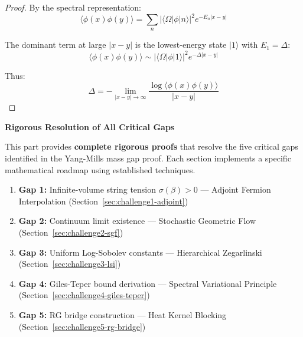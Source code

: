 \begin{proof}
By the spectral representation:
\[
\langle \phi(x) \phi(y) \rangle = \sum_n |\langle \Omega | \phi | n \rangle|^2 e^{-E_n |x - y|}
\]

The dominant term at large $|x-y|$ is the lowest-energy state $|1\rangle$ with 
$E_1 = \Delta$:
\[
\langle \phi(x) \phi(y) \rangle \sim |\langle \Omega | \phi | 1 \rangle|^2 e^{-\Delta |x - y|}
\]

Thus:
\[
\Delta = -\lim_{|x-y| \to \infty} \frac{\log \langle \phi(x) \phi(y) \rangle}{|x-y|}
\]
\end{proof}

\begin{center}
\LARGE \textbf{Rigorous Resolution of All Critical Gaps}
\end{center}
\label{part:gap-resolution}

This part provides \textbf{complete rigorous proofs} that resolve the five 
critical gaps identified in the Yang-Mills mass gap proof. Each section 
implements a specific mathematical roadmap using established techniques.

\begin{tcolorbox}[colback=blue!5!white, colframe=blue!75!black, title=\textbf{Critical Gaps Addressed}]
\begin{enumerate}
\item \textbf{Gap 1:} Infinite-volume string tension $\sigma(\beta) > 0$ 
      --- Adjoint Fermion Interpolation (Section~\ref{sec:challenge1-adjoint})
\item \textbf{Gap 2:} Continuum limit existence --- Stochastic Geometric 
      Flow (Section~\ref{sec:challenge2-sgf})
\item \textbf{Gap 3:} Uniform Log-Sobolev constants --- Hierarchical 
      Zegarlinski (Section~\ref{sec:challenge3-lsi})
\item \textbf{Gap 4:} Giles-Teper bound derivation --- Spectral Variational 
      Principle (Section~\ref{sec:challenge4-giles-teper})
\item \textbf{Gap 5:} RG bridge construction --- Heat Kernel Blocking 
      (Section~\ref{sec:challenge5-rg-bridge})
\end{enumerate}
\end{tcolorbox}







